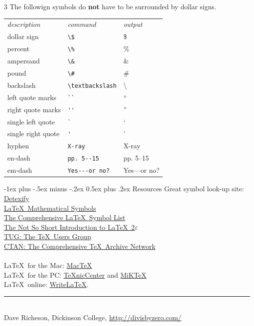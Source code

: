 \documentclass[10pt,landscape]{article}
\makeatletter
\renewcommand{\section}{\@startsection{section}{1}{0mm}%
                                {-1ex plus -.5ex minus -.2ex}%
                                {0.5ex plus .2ex}%
                                {\normalfont\large\bfseries}}
\makeatother
\begin{document}
\begin{multicols}{3}
The followign symbols do \textbf{not} have to be surrounded by dollar signs.

\begin{tabular}{lll}
\emph{description} & \emph{command} & \emph{output}\\
dollar sign & \verb!\$! & \$ \\
percent & \verb!\%! & \% \\
ampersand & \verb!\&! & \& \\
pound & \verb!\#! & \# \\
backslash & \verb!\textbackslash! & \textbackslash \\
left quote marks & \verb!``! & `` \\
right quote marks & \verb!''! & '' \\
single left quote  & \verb!`! & ` \\
single right quote  & \verb!'! & ' \\
hyphen & \verb!X-ray! & X-ray\\
en-dash & \verb!pp. 5--15! & pp. 5--15 \\
em-dash & \verb!Yes---or no?! & Yes---or no? 
\end{tabular}

\section{Resources}
Great symbol look-up site: \href{http://detexify.kirelabs.org/}{Detexify}\\
\href{http://amath.colorado.edu/documentation/LaTeX/Symbols.pdf}{\LaTeX\ Mathematical Symbols}\\
\href{ftp://tug.ctan.org/pub/tex-archive/info/symbols/comprehensive/symbols-letter.pdf}{The Comprehensive \LaTeX\ Symbol List}\\ 
\href{http://mirrors.med.harvard.edu/ctan/info/lshort/english/lshort.pdf}{The Not So Short Introduction to \LaTeX\ 2$\varepsilon$}\\
\href{http://www.tug.org/}{TUG: The \TeX\ Users Group}\\
\href{http://www.ctan.org/}{CTAN: The Comprehensive \TeX\ Archive Network}\\
~\\
\LaTeX\ for the Mac: \href{http://www.tug.org/mactex/}{Mac\TeX}\\
\LaTeX\ for the PC: \href{http://www.texniccenter.org/}{{\TeX}nicCenter} and \href{http://miktex.org/}{MiK\TeX}\\
\LaTeX\ online: \href{http://www.writelatex.com/}{WriteLaTeX}.
\vfill
\hrule
~\\
Dave Richeson, Dickinson College, \href{http://divisbyzero.com/}{http://divisbyzero.com/}
\end{multicols}
\end{document}
